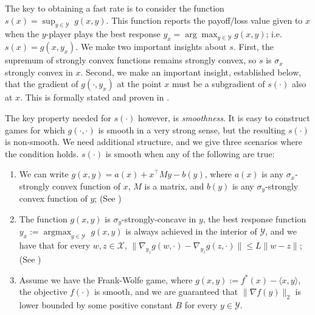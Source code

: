 \documentclass[final,12pt]{colt2018} %
\def\argmax{\mathop{\arg\max}}
\def\BR{\textsc{BestResponse}\xspace}
\newcommand{\yx}[1]{y_{#1}}
\newcommand{\XX}{\mathcal{X}}
\newcommand{\YY}{\mathcal{Y}}
\begin{document}


The key to obtaining a fast rate is to consider the function $s(x) = \sup_{y \in \YY}\; g(x,y).$ This function reports the payoff/loss value given to $x$ when the $y$-player plays the best response $\yx{x} = \arg\max_{y \in \YY} g(x,y)$; i.e. $s(x) = g(x,\yx{x})$. We make two important insights about $s$. First, the supremum of strongly convex functions remains strongly convex, so $s$ is $\sigma_x$ strongly convex in $x$. Second, we make an important insight, established below, that the gradient of $g(\cdot, y_x)$ at the point $x$ must be a subgradient of $s(\cdot)$ also at $x$. This is formally stated and proven in .


The key property needed for $s(\cdot)$ however, is \emph{smoothness}. It is easy to construct games for which $g(\cdot,\cdot)$ is smooth in a very strong sense, but the resulting $s(\cdot)$ is non-smooth. We need additional structure, and we give three scenarios where the condition holds. $s(\cdot)$ is smooth when any of the following are true:
\begin{enumerate}[itemsep=0mm]
    \item We can write $g( x, y ) = a(x) +  x^\top M y - b(y)$, where $a(x)$ is any $\sigma_x$-strongly convex function of $x$, $M$ is a matrix, and $b(y)$ is any $\sigma_y$-strongly convex function of $y$; (See )
  \item The function $g(x,y)$ is $\sigma_y$-strongly-concave in $y$, the best response function $y_x := \argmax_{y \in \YY}$ $g(x,y)$ is always achieved in the interior of $\YY$, and we have that for every $w,z \in \XX$,  $\| \nabla_{\yx{z}} g(w,\cdot) - \nabla_{\yx{z}} g(z,\cdot)   \| \le L \| w - z \|$; (See )
  \item Assume we have the Frank-Wolfe game, where $g(x,y) := f^*(x) - \langle x, y \rangle$, the objective $f(\cdot)$ is smooth, and we are guaranteed that $\|\nabla f(y)\|_2$ is lower bounded by some positive constant $B$ for every $y \in \YY$.
\end{enumerate}
\end{document}
